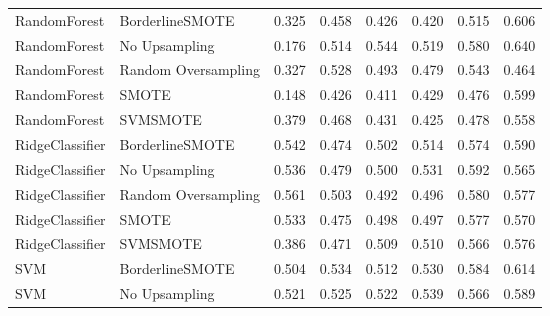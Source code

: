 \begin{tabular}{llllllll}
                RandomForest &     BorderlineSMOTE & 0.325 &                     0.458 &                 0.426 &                  0.420 &                                   0.515 &     0.606 \\
                RandomForest &       No Upsampling & 0.176 &                     0.514 &                 0.544 &                  0.519 &                                   0.580 &     0.640 \\
                RandomForest & Random Oversampling & 0.327 &                     0.528 &                 0.493 &                  0.479 &                                   0.543 &     0.464 \\
                RandomForest &               SMOTE & 0.148 &                     0.426 &                 0.411 &                  0.429 &                                   0.476 &     0.599 \\
                RandomForest &            SVMSMOTE & 0.379 &                     0.468 &                 0.431 &                  0.425 &                                   0.478 &     0.558 \\
             RidgeClassifier &     BorderlineSMOTE & 0.542 &                     0.474 &                 0.502 &                  0.514 &                                   0.574 &     0.590 \\
             RidgeClassifier &       No Upsampling & 0.536 &                     0.479 &                 0.500 &                  0.531 &                                   0.592 &     0.565 \\
             RidgeClassifier & Random Oversampling & 0.561 &                     0.503 &                 0.492 &                  0.496 &                                   0.580 &     0.577 \\
             RidgeClassifier &               SMOTE & 0.533 &                     0.475 &                 0.498 &                  0.497 &                                   0.577 &     0.570 \\
             RidgeClassifier &            SVMSMOTE & 0.386 &                     0.471 &                 0.509 &                  0.510 &                                   0.566 &     0.576 \\
                         SVM &     BorderlineSMOTE & 0.504 &                     0.534 &                 0.512 &                  0.530 &                                   0.584 &     0.614 \\
                         SVM &       No Upsampling & 0.521 &                     0.525 &                 0.522 &                  0.539 &                                   0.566 &     0.589 \\

\end{tabular}
